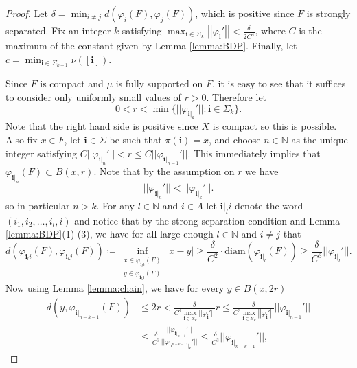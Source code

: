 \documentclass{PRM}
\newcommand{\field}[1]{\mathbb{#1}}
\newcommand{\N}{\field{N}}
\newcommand{\norm}[1]{\left|\left|#1\right|\right|}
\newcommand{\diam}{\mathrm{diam}}
\theoremstyle{plain}
\theoremstyle{definition}
\theoremstyle{remark}
\begin{document}
\begin{proof}
Let $\delta = \min_{i\ne j}d(\varphi_i(F),\varphi_j(F))$, which is positive since $F$ is strongly separated. Fix an integer $k$ satisfying $\max_{\mathbf{i}\in\Sigma_k}\norm{\varphi_{\mathbf{i}}'}< \frac{\delta}{2C^4}$, where $C$ is the maximum of the constant given by Lemma \ref{lemma:BDP}. Finally, let $c=\min_{\mathbf{i}\in\Sigma_{k+1}}\nu([\mathbf{i}])$.

Since $F$ is compact and $\mu$ is fully supported on $F$, it is easy to see that it suffices to consider only uniformly small values of $r>0$.
Therefore let 
\begin{equation*}
0<r<\min\{||\varphi_{\mathbf{i}|_k}'||\colon \mathbf{i}\in\Sigma_k\}.
\end{equation*}
Note that the right hand side is positive since $X$ is compact so this is possible. Also fix $x\in F$, let $\mathbf{i}\in\Sigma$ be such that $\pi(\mathbf{i})=x$, and choose $n\in\N$ as the unique integer satisfying $C||\varphi_{\mathbf{i}|_n}'||< r \leq C||\varphi_{\mathbf{i}|_{n-1}}'||$. This immediately implies that $\varphi_{\mathbf{i}|_n}(F)\subset B(x,r)$. Note that by the assumption on $r$ we have
\begin{equation*}
    ||\varphi_{\mathbf{i}|_n}'|| <||\varphi_{\mathbf{i}|_k}'||.
\end{equation*}
so in particular $n>k$. For any $l\in\N$ and $i\in\Lambda$ let $\mathbf{i}|_li$ denote the word $(i_1,i_2,\ldots, i_l,i)$ and notice that by the strong separation condition and Lemma \ref{lemma:BDP}(1)-(3), we have for all large enough $l\in\N$ and $i\ne j$ that
\begin{equation}\label{eq:ssc}
    d(\varphi_{\mathbf{i}_l i}(F),\varphi_{\mathbf{i}_l j}(F))\coloneqq\inf_{\substack{x\in \varphi_{\mathbf{i}_l i}(F) \\y\in \varphi_{\mathbf{i}_l j}(F)}}|x-y|\geq \frac{\delta}{C^2}\cdot \diam(\varphi_{\mathbf{i}|_l}(F))\geq \frac{\delta}{C^3}||\varphi_{\mathbf{i}|_l}'||.
\end{equation}
Now using Lemma \ref{lemma:chain}, we have for every $y\in B(x,2r)$
\begin{align*}
    d(y,\varphi_{\mathbf{i}|_{n-k-1}}(F))&\leq 2r< \frac{\delta}{C^4\max_{\mathbf{i}\in\Sigma_k}||\varphi_{\mathbf{i}}'||}r\leq \frac{\delta}{C^3\max_{\mathbf{i}\in\Sigma_k}\norm{\varphi_{\mathbf{i}}'}}||\varphi_{\mathbf{i}|_{n-1}}'||\\
    &\leq\frac{\delta}{C^3}\frac{||\varphi_{\mathbf{i}|_{n-1}}'||}{||\varphi_{\sigma^{n-k-1}\mathbf{i}|_{k}}'||}\leq \frac{\delta}{C^3} ||\varphi_{\mathbf{i}|_{n-k-1}}'||,

\end{align*}
\end{proof}
\end{document}
